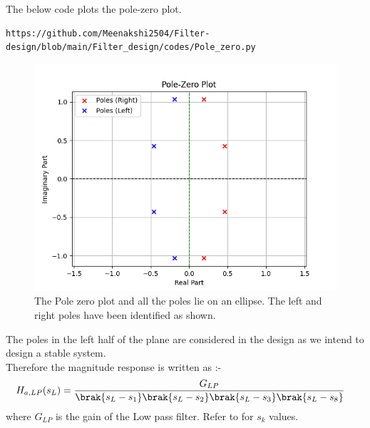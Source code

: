 \documentclass{article}
\begin{document}
\begin{enumerate}
The below code plots the pole-zero plot.
\begin{lstlisting}
https://github.com/Meenakshi2504/Filter-design/blob/main/Filter_design/codes/Pole_zero.py
\end{lstlisting}
\begin{figure}[H]
\centering
\includegraphics[width=1\columnwidth]{figs/Pole_Zero_plt.png}
\caption{The Pole zero plot and all the poles lie on an ellipse. The left and right poles have been identified as shown.}
\label{fig:pole_zero_plt}
\end{figure}
The poles in the left half of the plane are considered in the design as we intend to design a stable system.\\
Therefore the magnitude response is written as :- 
\begin{align}
    H_{a,LP}(s_L) &= \frac{G_{LP}}{\brak{s_L-s_1}\brak{s_L-s_2}\brak{s_L-s_3}\brak{s_L-s_8}}
\end{align}
where $G_{LP}$ is the gain of the Low pass filter. Refer to  for $s_k$ values.\\


\end{enumerate}
\end{document}
